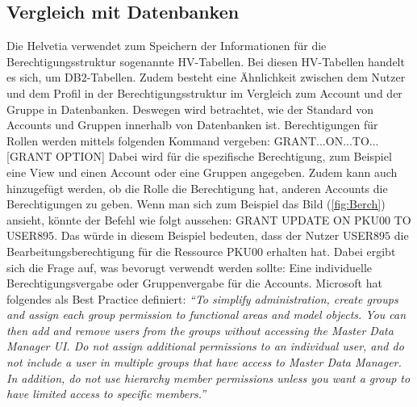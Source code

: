 \subsection{Vergleich mit Datenbanken}
\label{sec:chapter04:DB}
Die Helvetia verwendet zum Speichern der Informationen für die Berechtigungsstruktur sogenannte HV-Tabellen.
Bei diesen HV-Tabellen handelt es sich, um DB$2$-Tabellen.
Zudem besteht eine Ähnlichkeit zwischen dem Nutzer und dem Profil in der Berechtigungsstruktur im Vergleich zum Account und der Gruppe in Datenbanken.
Deswegen wird betrachtet, wie der Standard von Accounts und Gruppen innerhalb von Datenbanken ist.
\newline
Berechtigungen für Rollen werden mittels folgenden Kommand vergeben: 
\newline
\newline
GRANT...ON...TO...[GRANT OPTION]
\newline
\newline
Dabei wird für die spezifische Berechtigung, zum Beispiel eine View und einen Account oder eine Gruppen angegeben.
Zudem kann auch hinzugefügt werden, ob die Rolle die Berechtigung hat, anderen Accounts die Berechtigungen zu geben.\cite[474-475]{Ram09}
\newline
Wenn man sich zum Beispiel das Bild (\ref{fig:Berch}) ansieht, könnte der Befehl wie folgt aussehen:
\newline
\newline
GRANT UPDATE ON PKU$00$ TO USER$895$.
\newline
\newline
Das würde in diesem Beispiel bedeuten, dass der Nutzer USER$895$ die Bearbeitungsberechtigung für die Ressource PKU00 erhalten hat.
Dabei ergibt sich die Frage auf, was bevorugt verwendt werden sollte:
\newline
Eine individuelle Berechtigungsvergabe oder Gruppenvergabe für die Accounts.
Microsoft hat folgendes als Best Practice definiert:
\newline
\newline
\textit{"`To simplify administration, create groups and assign each group permission to functional areas and model objects.
You can then add and remove users from the groups without accessing the Master Data Manager UI.
\newline
\newline
Do not assign additional permissions to an individual user, and do not include a user in multiple groups that have access to Master Data Manager. In addition, do not use hierarchy member permissions unless you want a group to have limited access to specific members."'} \cite{Micro}
